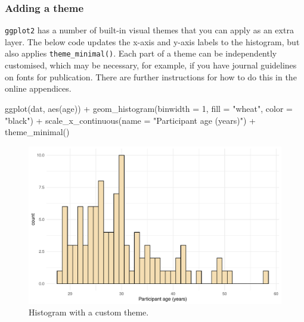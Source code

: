 \documentclass[
  english,
  doc,floatsintext]{apa6}
\newenvironment{Shaded}{\begin{snugshade}}{\end{snugshade}}
\newcommand{\AttributeTok}[1]{\textcolor[rgb]{0.77,0.63,0.00}{#1}}
\newcommand{\DecValTok}[1]{\textcolor[rgb]{0.00,0.00,0.81}{#1}}
\newcommand{\FunctionTok}[1]{\textcolor[rgb]{0.00,0.00,0.00}{#1}}
\newcommand{\NormalTok}[1]{#1}
\newcommand{\SpecialCharTok}[1]{\textcolor[rgb]{0.00,0.00,0.00}{#1}}
\newcommand{\StringTok}[1]{\textcolor[rgb]{0.31,0.60,0.02}{#1}}
\begin{document}
\hypertarget{adding-a-theme}{%
\subsubsection{Adding a theme}\label{adding-a-theme}}

\texttt{ggplot2} has a number of built-in visual themes that you can apply as an extra layer. The below code updates the x-axis and y-axis labels to the histogram, but also applies \texttt{theme\_minimal()}. Each part of a theme can be independently customised, which may be necessary, for example, if you have journal guidelines on fonts for publication. There are further instructions for how to do this in the online appendices.

\begin{Shaded}
\begin{Highlighting}[]
\FunctionTok{ggplot}\NormalTok{(dat, }\FunctionTok{aes}\NormalTok{(age)) }\SpecialCharTok{+}
  \FunctionTok{geom\_histogram}\NormalTok{(}\AttributeTok{binwidth =} \DecValTok{1}\NormalTok{, }\AttributeTok{fill =} \StringTok{"wheat"}\NormalTok{, }\AttributeTok{color =} \StringTok{"black"}\NormalTok{) }\SpecialCharTok{+}
  \FunctionTok{scale\_x\_continuous}\NormalTok{(}\AttributeTok{name =} \StringTok{"Participant age (years)"}\NormalTok{) }\SpecialCharTok{+}
  \FunctionTok{theme\_minimal}\NormalTok{()}
\end{Highlighting}
\end{Shaded}

\begin{figure}

{\centering \includegraphics[width=1\linewidth]{images/histogram-theme-1} 

}

\caption{Histogram with a custom theme.}\label{fig:histogram-theme}
\end{figure}
\end{document}
